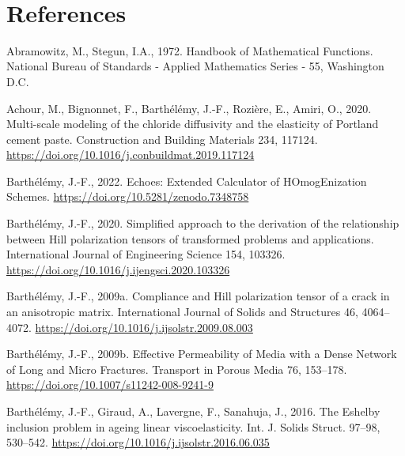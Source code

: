 \documentclass[
  a4paper,
  numbers=noendperiod,
  DIV=12]{scrreprt}
\newlength{\cslhangindent}
\newenvironment{CSLReferences}[2] %
 {\begin{list}{}{%
  \setlength{\itemindent}{0pt}
  \setlength{\leftmargin}{0pt}
  \setlength{\parsep}{0pt}
  \ifodd #1
   \setlength{\leftmargin}{\cslhangindent}
   \setlength{\itemindent}{-1\cslhangindent}
  \fi
  \setlength{\itemsep}{#2\baselineskip}}}
 {\end{list}}
\begin{document}
\(\,\)


\chapter*{References}\label{references}


\protect{}\label{refs}
\begin{CSLReferences}{1}{0}
Abramowitz, M., Stegun, I.A., 1972. Handbook of {Mathematical
Functions}. National Bureau of Standards - Applied Mathematics Series -
55, Washington D.C.

Achour, M., Bignonnet, F., Barthélémy, J.-F., Rozière, E., Amiri, O.,
2020. Multi-scale modeling of the chloride diffusivity and the
elasticity of {Portland} cement paste. Construction and Building
Materials 234, 117124.
\url{https://doi.org/10.1016/j.conbuildmat.2019.117124}

Barthélémy, J.-F., 2022. Echoes: {Extended Calculator} of
{HOmogEnization Schemes}. \url{https://doi.org/10.5281/zenodo.7348758}

Barthélémy, J.-F., 2020. Simplified approach to the derivation of the
relationship between {Hill} polarization tensors of transformed problems
and applications. International Journal of Engineering Science 154,
103326. \url{https://doi.org/10.1016/j.ijengsci.2020.103326}

Barthélémy, J.-F., 2009a. Compliance and {Hill} polarization tensor of a
crack in an anisotropic matrix. International Journal of Solids and
Structures 46, 4064--4072.
\url{https://doi.org/10.1016/j.ijsolstr.2009.08.003}

Barthélémy, J.-F., 2009b. Effective {Permeability} of {Media} with a
{Dense Network} of {Long} and {Micro Fractures}. Transport in Porous
Media 76, 153--178. \url{https://doi.org/10.1007/s11242-008-9241-9}

Barthélémy, J.-F., Giraud, A., Lavergne, F., Sanahuja, J., 2016. The
{Eshelby} inclusion problem in ageing linear viscoelasticity. Int. J.
Solids Struct. 97--98, 530--542.
\url{https://doi.org/10.1016/j.ijsolstr.2016.06.035}


\end{CSLReferences}
\end{document}
